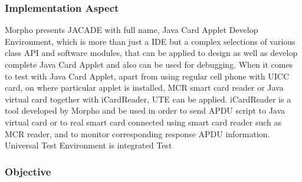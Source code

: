 \documentclass[]{llncs}
\begin{document}
\subsubsection{Implementation Aspect}
Morpho presents JACADE with full name, Java Card Applet Develop Environment, which is more than just a IDE but a complex selections of various class API and software modules, that can be applied to design as well as develop complete Java Card Applet and also can be used for debugging. When it comes to test with Java Card Applet, apart from using regular cell phone with UICC card, on where particular applet is installed, MCR smart card reader or Java  virtual card together with iCardReader, UTE can be applied. iCardReader is a tool developed by Morpho and be used in order to send APDU script to Java virtual card or to real smart card connected using smart card reader such as MCR reader, and to monitor corresponding response APDU information. Universal Test Environment is integrated Test

\subsubsection{Objective}




\end{document}
